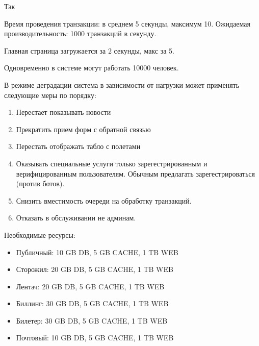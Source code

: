Так

Время проведения транзакции: в среднем 5 секунды, максимум 10.
Ожидаемая производительность: 1000 транзакций в секунду.

Главная страница загружается за 2 секунды, макс за 5.

Одновременно в системе могут работать 10000 человек.

В режиме деградации система в зависимости от нагрузки
может применять следующие меры по порядку:
\begin{enumerate}
    \item Перестает показывать новости
    \item Прекратить прием форм с обратной связью
    \item Перестать отображать табло с полетами
    \item Оказывать специальные услуги только
          зарегестрированным и верифицированным
          пользователям. Обычным предлагать
          зарегестрироваться (против ботов).
    \item Снизить вместимость очереди на обработку
          транзакций.
    \item Отказать в обслуживании не админам.
\end{enumerate}

Необходимые ресурсы:
\begin{itemize}
    \item Публичный: 10 GB DB, 5 GB CACHE, 1 TB WEB
    \item Сторожил: 20 GB DB, 5 GB CACHE, 1 TB WEB
    \item Лентач: 20 GB DB, 5 GB CACHE, 1 TB WEB
    \item Биллинг: 30 GB DB, 5 GB CACHE, 1 TB WEB
    \item Билетер: 30 GB DB, 5 GB CACHE, 1 TB WEB
    \item Почтовый: 10 GB DB, 5 GB CACHE, 1 TB WEB
\end{itemize}

